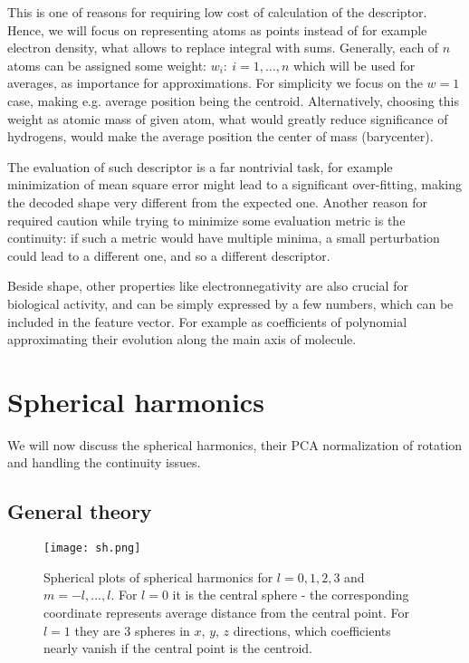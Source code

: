 \documentclass[10pt,journal]{IEEEtranTCOM}
\theoremstyle{plain}
\begin{document}
This is one of reasons for requiring low cost of calculation of the descriptor. Hence, we will focus on representing atoms as points instead of for example electron density, what allows to replace integral with sums. Generally, each of $n$ atoms can be assigned some weight: $w_i:\ i=1,\ldots,n$ which will be used for averages, as importance for approximations. For simplicity we focus on the $w=1$ case, making e.g. average position being the centroid. Alternatively, choosing this weight as atomic mass of given atom, what would greatly reduce significance of hydrogens, would make the average position the center of mass (barycenter).

The evaluation of such descriptor is a far nontrivial task, for example minimization of mean square error might lead to a significant over-fitting, making the decoded shape very different from the expected one. Another reason for required caution while trying to minimize some evaluation metric is the continuity: if such a metric would have multiple minima, a small perturbation could lead to a different one, and so a different descriptor.

Beside shape, other properties like electronnegativity are also crucial for biological activity, and can be simply expressed by a few numbers, which can be included in the feature vector. For example as coefficients of polynomial approximating their evolution along the main axis of molecule.

\section{Spherical harmonics}
We will now discuss the spherical harmonics, their PCA normalization of rotation and handling the continuity issues.
\subsection{General theory}
\begin{figure}[t!]
    \centering
        \texttt{[image: sh.png]}
        \caption{Spherical plots of spherical harmonics for $l=0,1,2,3$ and $m=-l, ..., l$. For $l=0$ it is the central sphere - the corresponding coordinate represents average distance from the central point. For $l=1$ they are 3 spheres in $x$, $y$, $z$ directions, which coefficients nearly vanish if the central point is the centroid. }
        \label{sh}
\end{figure}
\end{document}
